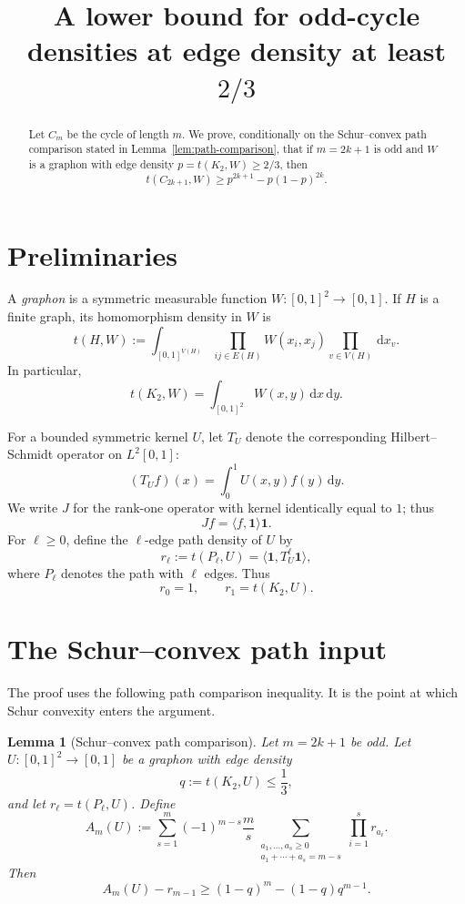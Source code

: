 \documentclass[11pt]{article}
\title{A lower bound for odd-cycle densities at edge density at least \texorpdfstring{$2/3$}{2/3}}
\author{}
\date{}
\newtheorem{lemma}{Lemma}
\newcommand{\one}{\mathbf 1}
\newcommand{\dd}{\,\mathrm d}
\begin{document}
\maketitle

\begin{abstract}
Let $C_m$ be the cycle of length $m$.  We prove, conditionally on the
Schur--convex path comparison stated in Lemma~\ref{lem:path-comparison},
that if $m=2k+1$ is odd and $W$ is a graphon with edge density
$p=t(K_2,W)\ge 2/3$, then
\[
    t(C_{2k+1},W)\ge p^{2k+1}-p(1-p)^{2k}.
\]
\end{abstract}

\section{Preliminaries}

A \emph{graphon} is a symmetric measurable function
$W:[0,1]^2\to[0,1]$.  If $H$ is a finite graph, its homomorphism density
in $W$ is
\[
    t(H,W)
    :=
    \int_{[0,1]^{V(H)}}
    \prod_{ij\in E(H)} W(x_i,x_j)
    \prod_{v\in V(H)} \dd x_v .
\]
In particular,
\[
    t(K_2,W)=\int_{[0,1]^2}W(x,y)\dd x\dd y.
\]

For a bounded symmetric kernel $U$, let $T_U$ denote the corresponding
Hilbert--Schmidt operator on $L^2[0,1]$:
\[
    (T_U f)(x)=\int_0^1 U(x,y)f(y)\dd y.
\]
We write $J$ for the rank-one operator with kernel identically equal to
$1$; thus
\[
    Jf=\langle f,\one\rangle\one.
\]
For $\ell\ge 0$, define the $\ell$-edge path density of $U$ by
\[
    r_\ell:=t(P_\ell,U)=\langle \one,T_U^\ell\one\rangle,
\]
where $P_\ell$ denotes the path with $\ell$ edges.  Thus
\[
    r_0=1,
    \qquad
    r_1=t(K_2,U).
\]

\section{The Schur--convex path input}

The proof uses the following path comparison inequality.  It is the point
at which Schur convexity enters the argument.

\begin{lemma}[Schur--convex path comparison]
\label{lem:path-comparison}
Let $m=2k+1$ be odd.  Let $U:[0,1]^2\to[0,1]$ be a graphon with
edge density
\[
    q:=t(K_2,U)\le \frac13,
\]
and let $r_\ell=t(P_\ell,U)$.  Define
\[
    A_m(U)
    :=
    \sum_{s=1}^{m}(-1)^{m-s}\frac{m}{s}
    \sum_{\substack{a_1,\dots,a_s\ge 0\\ a_1+\cdots+a_s=m-s}}
    \prod_{i=1}^{s} r_{a_i}.
\]
Then
\[
    A_m(U)-r_{m-1}
    \ge
    (1-q)^m-(1-q)q^{m-1}.
\]
\end{lemma}
\end{document}
